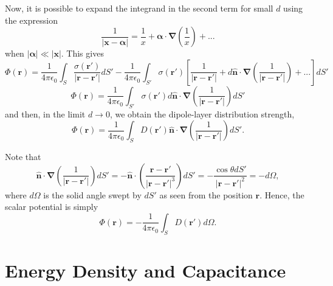 Now, it is possible to expand the integrand in the second term for small $d$ using the expression
\begin{equation}
\frac{1 }{\left| \textbf{x} - \boldsymbol{\alpha} \right| } = \frac{1}{x} + \boldsymbol{\alpha} \cdot \boldsymbol{\nabla} \left( \frac{1}{x} \right) + ... 
\end{equation}
when $\left| \boldsymbol{\alpha} \right| \ll \left| \textbf{x} \right|$. This gives
\begin{equation}
\Phi (\textbf{r}) =  \frac{1}{4\pi \epsilon_0}  \int _S  \frac{\sigma (\textbf{r}') }{\left| \textbf{r} - \textbf{r}' \right| }  dS'- \frac{1}{4\pi \epsilon_0}  \int_{S'}  \sigma (\textbf{r}')  \left[ \frac{1}{\left| \textbf{r} - \textbf{r}'  \right| } +  d \hat{\textbf{n}} \cdot \boldsymbol{\nabla} \left( \frac{1}{\left| \textbf{r} - \textbf{r}'  \right| } \right) + ...\right] dS'
\end{equation}
\begin{equation}
\Phi (\textbf{r}) =  \frac{1}{4\pi \epsilon_0}  \int_{S'}  \sigma (\textbf{r}')  d \hat{\textbf{n}} \cdot \boldsymbol{\nabla} \left( \frac{1}{\left| \textbf{r} - \textbf{r}'  \right| } \right) dS'
\end{equation}
and then, in the limit $d \rightarrow 0$, we obtain the dipole-layer distribution strength,
\begin{equation}
\Phi (\textbf{r}) =  \frac{1}{4\pi \epsilon_0}  \int_{S}  D(\textbf{r}') \hat{\textbf{n}} \cdot \boldsymbol{\nabla} \left( \frac{1}{\left| \textbf{r} - \textbf{r}'  \right| } \right) dS'.
\end{equation}

Note that
\begin{equation}
\hat{\textbf{n}} \cdot \boldsymbol{\nabla} \left( \frac{1}{\left| \textbf{r} - \textbf{r}'  \right| } \right) dS' = - \hat{\textbf{n}} \cdot  \left( \frac{\textbf{r} - \textbf{r}' }{\left| \textbf{r} - \textbf{r}'  \right| ^3 } \right) dS' = -    \frac{ \cos \theta dS' }{\left| \textbf{r} - \textbf{r}'  \right| ^2 } = -d\Omega,
\end{equation}
where $d\Omega$ is the solid angle swept by $dS'$ as seen from the position $\textbf{r}$. Hence, the scalar potential is simply
\begin{equation}
\Phi (\textbf{r}) = -  \frac{1}{4\pi \epsilon_0}  \int_{S}  D(\textbf{r}') d\Omega.
\end{equation}

\section{Energy Density and Capacitance}

